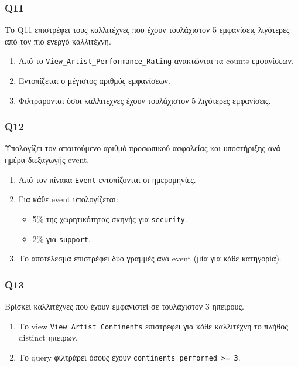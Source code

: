 \documentclass[13pt]{extarticle}
\begin{document}
\subsubsection{Q11}

Το Q11 επιστρέφει τους καλλιτέχνες που έχουν τουλάχιστον 5 εμφανίσεις λιγότερες από τον πιο ενεργό καλλιτέχνη.

\begin{enumerate}
    \item Από το \texttt{View\_Artist\_Performance\_Rating} ανακτώνται τα counts εμφανίσεων.
    \item Εντοπίζεται ο μέγιστος αριθμός εμφανίσεων.
    \item Φιλτράρονται όσοι καλλιτέχνες έχουν τουλάχιστον 5 λιγότερες εμφανίσεις.
\end{enumerate}

\subsubsection{Q12}

Υπολογίζει τον απαιτούμενο αριθμό προσωπικού ασφαλείας και υποστήριξης ανά ημέρα διεξαγωγής event.

\begin{enumerate}
    \item Από τον πίνακα \texttt{Event} εντοπίζονται οι ημερομηνίες.
    \item Για κάθε event υπολογίζεται:
    \begin{itemize}
        \item 5\% της χωρητικότητας σκηνής για \texttt{security}.
        \item 2\% για \texttt{support}.
    \end{itemize}
    \item Το αποτέλεσμα επιστρέφει δύο γραμμές ανά event (μία για κάθε κατηγορία).
\end{enumerate}

\subsubsection{Q13}

Βρίσκει καλλιτέχνες που έχουν εμφανιστεί σε τουλάχιστον 3 ηπείρους.

\begin{enumerate}
    \item Το view \texttt{View\_Artist\_Continents} επιστρέφει για κάθε καλλιτέχνη το πλήθος distinct ηπείρων.
    \item Το query φιλτράρει όσους έχουν \texttt{continents\_performed >= 3}.
\end{enumerate}
\end{document}
